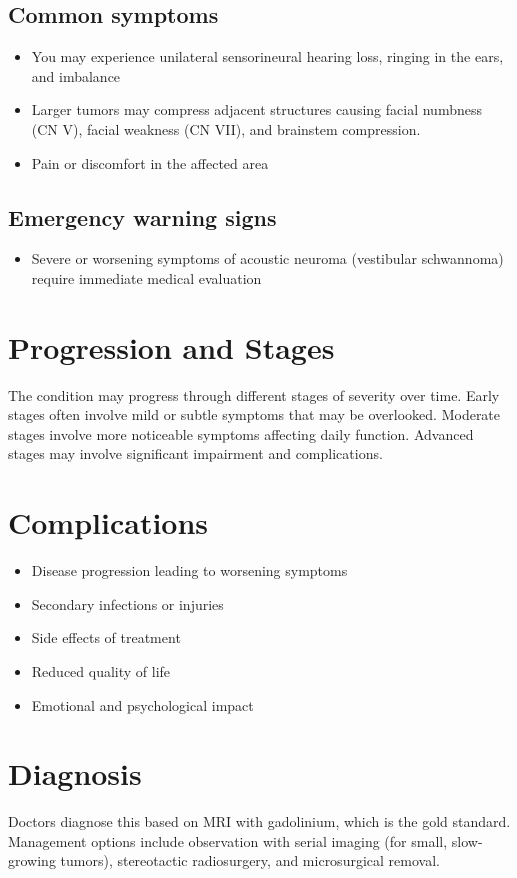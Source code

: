 \subsection{Common symptoms}
\begin{itemize}[noitemsep]
  \item You may experience unilateral sensorineural hearing loss, ringing in the ears, and imbalance
  \item Larger tumors may compress adjacent structures causing facial numbness (CN V), facial weakness (CN VII), and brainstem compression.
  \item Pain or discomfort in the affected area
  \end{itemize}
\subsection{Emergency warning signs}
\begin{itemize}[noitemsep]
  \item Severe or worsening symptoms of acoustic neuroma (vestibular schwannoma) require immediate medical evaluation
\end{itemize}
\section{Progression and Stages}
The condition may progress through different stages of severity over time. Early stages often involve mild or subtle symptoms that may be overlooked. Moderate stages involve more noticeable symptoms affecting daily function. Advanced stages may involve significant impairment and complications.
\section{Complications}
\begin{itemize}[noitemsep]
  \item Disease progression leading to worsening symptoms
  \item Secondary infections or injuries
  \item Side effects of treatment
  \item Reduced quality of life
  \item Emotional and psychological impact
\end{itemize}
\section{Diagnosis}
Doctors diagnose this based on MRI with gadolinium, which is the gold standard. Management options include observation with serial imaging (for small, slow-growing tumors), stereotactic radiosurgery, and microsurgical removal.

